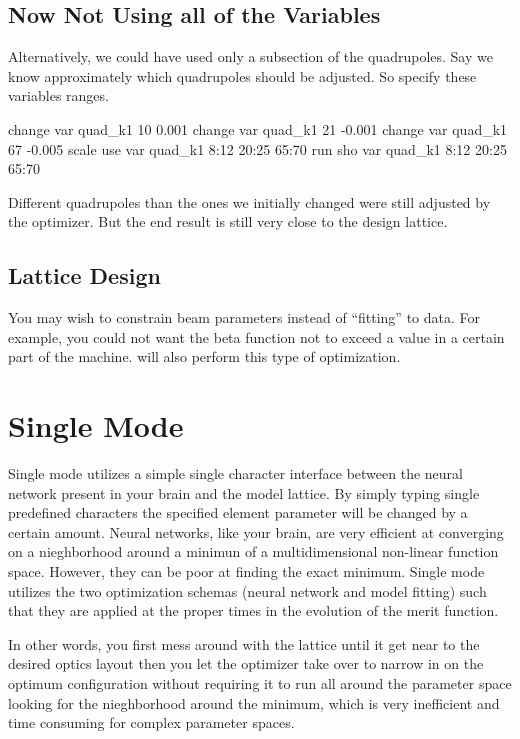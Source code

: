 \subsection{Now Not Using all of the Variables}
\label{ss:fix_it}

Alternatively, we could have used only a subsection of the quadrupoles. Say we
know approximately which quadrupoles should be adjusted. So specify these
variables ranges.
\begin{example}
  change var quad\_k1 10 0.001
  change var quad\_k1 21 -0.001
  change var quad\_k1 67 -0.005
  scale
  use var quad\_k1 8:12 20:25 65:70
  run
  sho var quad\_k1 8:12 20:25 65:70
\end{example}
Different quadrupoles than the ones we initially changed were still adjusted
by the optimizer. But the end result is still very close to the design lattice.

\subsection{Lattice Design}
\label{ss:lattice_design}

You may wish to constrain beam
parameters instead of ``fitting'' to data. For example, you could not want
the beta function not to exceed a value in a certain part of the machine. \tao will
also perform this type of optimization.


\section{Single Mode}
\label{s:single_mode}

Single mode utilizes a simple single character interface between the neural 
network present in your brain and the \tao model lattice. By simply typing
single predefined characters the specified element parameter will be changed by
a certain amount. Neural networks, like your brain, are very efficient at
converging on a nieghborhood around a minimun of a multidimensional non-linear
function space. However, they can be poor at finding the exact minimum. Single mode
utilizes the two optimization schemas (neural network and model fitting) such
that they are applied at the proper times in the evolution of the merit
function.

In other words, you first mess around with the lattice until it get near to the
desired optics layout then you let the optimizer take over to narrow in on the
optimum configuration without requiring it to run all around the
parameter space looking for the nieghborhood around the minimum, which is very
inefficient and time consuming for complex parameter spaces.

